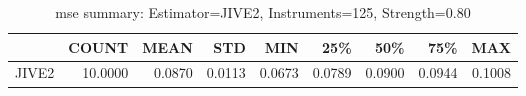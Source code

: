 \begin{table}[ht]
\centering
\caption{mse summary: Estimator=JIVE2, Instruments=125, Strength=0.80}
\begin{tabular}{lrrrrrrrr}
\toprule
 & COUNT & MEAN & STD & MIN & 25\% & 50\% & 75\% & MAX \\
\midrule
JIVE2 & 10.0000 & 0.0870 & 0.0113 & 0.0673 & 0.0789 & 0.0900 & 0.0944 & 0.1008 \\
\bottomrule
\end{tabular}
\end{table}
